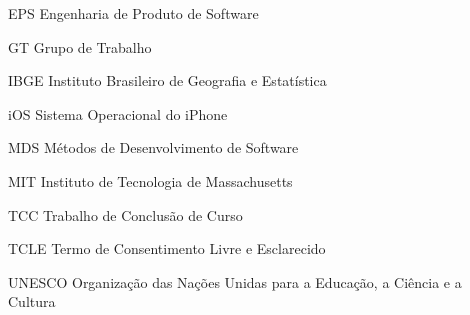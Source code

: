 \begin{siglas}
  \item[EPS] Engenharia de Produto de Software
  \item[GT] Grupo de Trabalho
  \item[IBGE] Instituto Brasileiro de Geografia e Estatística
  \item[iOS] Sistema Operacional do iPhone 
  \item[MDS] Métodos de Desenvolvimento de Software
  \item[MIT] Instituto de Tecnologia de Massachusetts
  \item[TCC] Trabalho de Conclusão de Curso 
  \item[TCLE] Termo de Consentimento Livre e Esclarecido 
  \item[UNESCO] Organização das Nações Unidas para a Educação, a Ciência e a Cultura
\end{siglas}
